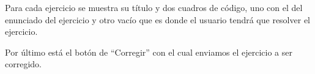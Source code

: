 Para cada ejercicio se muestra su título y dos cuadros de código, uno con el del enunciado del ejercicio y otro vacío que es donde el usuario tendrá que resolver el ejercicio.

Por último está el botón de ``Corregir'' con el cual enviamos el ejercicio a ser corregido.

\begin{figure}[H]
\begin{center}
\end{center}
\end{figure}

